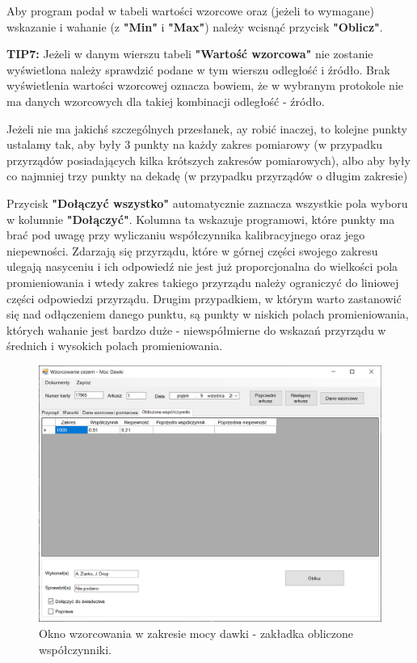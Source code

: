 Aby program podał w tabeli wartości wzorcowe oraz (jeżeli to wymagane) wskazanie i wahanie (z \textbf{"Min"} i \textbf{"Max"}) należy wcisnąć przycisk \textbf{"Oblicz"}. 

\textbf{TIP7:} Jeżeli w danym wierszu tabeli \textbf{"Wartość wzorcowa"} nie zostanie wyświetlona należy sprawdzić podane w tym wierszu odległość i źródło. Brak wyświetlenia wartości wzorcowej oznacza bowiem, że w wybranym protokole nie ma danych wzorcowych dla takiej kombinacji odległość - źródło.

Jeżeli nie ma jakichś szczególnych przesłanek, ay robić inaczej, to kolejne punkty ustalamy tak, aby były 3 punkty na każdy zakres pomiarowy (w przypadku przyrządów posiadających kilka krótszych zakresów pomiarowych), albo aby były co najmniej trzy punkty na dekadę (w przypadku przyrządów o długim zakresie)

Przycisk \textbf{"Dołączyć wszystko"} automatycznie zaznacza wszystkie pola wyboru w kolumnie \textbf{"Dołączyć"}. Kolumna ta wskazuje programowi, które punkty ma brać pod uwagę przy wyliczaniu współczynnika kalibracyjnego oraz jego niepewności. Zdarzają się przyrządu, które w górnej części swojego zakresu ulegają nasyceniu i ich odpowiedź nie jest już proporcjonalna do wielkości pola promieniowania i wtedy zakres takiego przyrządu należy ograniczyć do liniowej części odpowiedzi przyrządu. Drugim przypadkiem, w którym warto zastanowić się nad odłączeniem danego punktu, są punkty w niskich polach promieniowania, których wahanie jest bardzo duże - niewspółmierne do wskazań przyrządu w średnich i wysokich polach promieniowania.

\begin{figure}[htb]
	\centering
	\includegraphics[width=\columnwidth]{obrazki/Wzorcowanie/moc_dawki/wspolczynniki.png}
	\caption{Okno wzorcowania w zakresie mocy dawki - zakładka obliczone współczynniki.}
	\label{mocWspolczynniki}
\end{figure}

